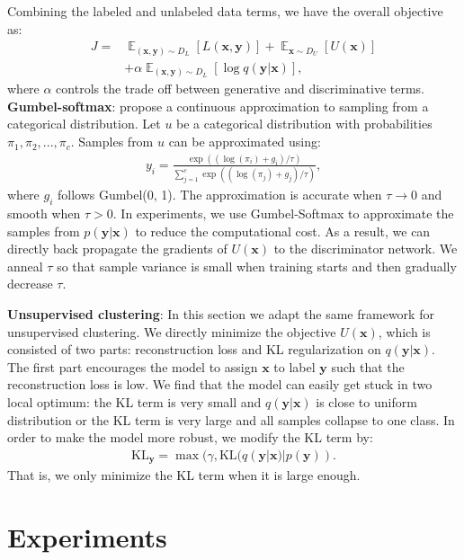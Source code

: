 \documentclass{article}
\DeclareMathOperator{\E}{\mathbb{E}}
\begin{document}
Combining the labeled and unlabeled data terms, we have the overall objective
as:
\begin{align*}
  J =& \E_{(\mathbf{x}, \mathbf{y}) \sim D_{L}}[L(\mathbf{x}, \mathbf{y})] + \E_{\mathbf{x} \sim D_{U}}[U(\mathbf{x})] \\
     & + \alpha \E_{(\mathbf{x}, \mathbf{y})\sim D_{L}}[\log q(\mathbf{y}|\mathbf{x})],
\end{align*}
where $\alpha$ controls the trade off between generative and
discriminative terms.
\\[0.2cm]
{\bf Gumbel-softmax}: \citet{jang2016categorical,maddison2016concrete} propose
a continuous approximation to sampling from a categorical
distribution. Let $u$ be a categorical distribution with
probabilities $\pi_{1}, \pi_{2}, ..., \pi_{c}$. Samples from $u$ can be approximated using:
\begin{align}
  y_{i} = \frac{\exp((\log (\pi_{i}) + g_{i}) / \tau)} {\sum_{j=1}^{c}
  \exp((\log(\pi_{j}) + g_{j})/\tau)},
\end{align}
where $g_{i}$ follows Gumbel(0, 1).
The approximation is accurate when $\tau\to 0$ and smooth when $\tau > 0$.
In experiments, we use Gumbel-Softmax to approximate the samples from
$p(\mathbf{y}|\mathbf{x})$ to reduce the computational cost. As a result, we can directly
back propagate the gradients of $U(\mathbf{x})$ to the discriminator network.
We anneal $\tau$ so that sample variance is small
when training starts and then gradually decrease $\tau$.

{\bf Unsupervised clustering}:
In this section we adapt the same framework for
unsupervised clustering. We directly minimize the objective
$U(\mathbf{x})$, which is consisted of two parts: reconstruction loss and KL
regularization on $q(\mathbf{y}|\mathbf{x})$. The first part encourages the
model to assign $\mathbf{x}$ to label $\mathbf{y}$ such that the
reconstruction loss is low. We find that the model can easily get stuck in two
local optimum: the KL term is very small and $q(\mathbf{y} | \mathbf{x})$
is close to uniform distribution or the KL term is very large and all
samples collapse to one class. In order to make the model more robust,
we modify the KL term by:
\begin{align}
  \text{KL}_{\mathbf{y}} = \max(\gamma, \text{KL}(q(\mathbf{y}|\mathbf{x}) | p(\mathbf{y})).
  \label{eq:gamma}
\end{align}
That is, we only minimize the KL term when it is large enough.

\section{Experiments}
\end{document}
